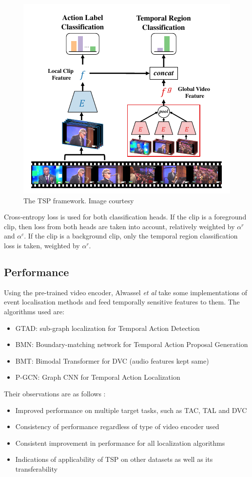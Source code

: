 \begin{figure}
\centering
\includegraphics[width=0.5\linewidth]{assets/img/alwassel2021tsp.png}
\caption{The TSP framework. Image courtesy \cite{alwassel2021tsp}}
\label{fig:tsp}
\end{figure}

\par Cross-entropy loss is used for both classification heads. If the clip is a foreground 
clip, then loss from both heads are taken into account, relatively weighted by $\alpha^r$ 
and $\alpha^c$. If the clip is a background clip, only the temporal region classification 
loss is taken, weighted by $\alpha^r$.

\subsection{Performance}
Using the pre-trained video encoder, Alwassel \textit{et al} take some implementations of event localisation methods and feed temporally sensitive features to them. The algorithms used are:
\begin{itemize}
\item GTAD: sub-graph localization for Temporal Action Detection
\item BMN: Boundary-matching network for Temporal Action Proposal Generation
\item BMT: Bimodal Transformer for DVC \cite{iashin2020better} (audio features kept same)
\item P-GCN: Graph CNN for Temporal Action Localization
\end{itemize}

Their observations are as follows \cite{alwassel2021tsp}:
\begin{itemize}
\item Improved performance on multiple target tasks, such as TAC, TAL and DVC
\item Consistency of performance regardless of type of video encoder used
\item Consistent improvement in performance for all localization algorithms
\item Indications of applicability of TSP on other datasets as well as its transferability
\end{itemize}

